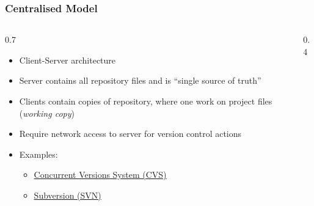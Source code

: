 \begin{frame}[fragile]
\frametitle{Centralised Model}
\begin{columns}[T]
    \begin{column}{0.7\textwidth}
        \begin{itemize}
            \item Client-Server architecture
            \item Server contains all repository files and is ``single source of truth''
            \item Clients contain copies of repository, where one work on project
                files (\emph{working copy})
            \item Require network access to server for version control actions
            \item Examples:
            \begin{itemize}
                \item \href{https://en.wikipedia.org/wiki/Concurrent_Versions_System}
                           {Concurrent Versions System (CVS)}
                \item \href{https://en.wikipedia.org/wiki/Apache_Subversion}
                           {Subversion (SVN)}
            \end{itemize}
        \end{itemize}
    \end{column}
    \begin{column}{0.4\textwidth}
        \begin{center}
        \resizebox{\textwidth}{!}{}
        \end{center}
    \end{column}
\end{columns}
\end{frame}

